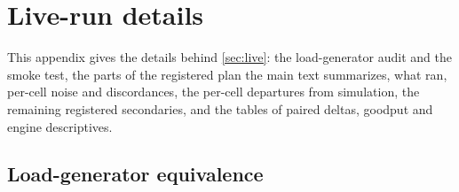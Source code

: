 %

\section{Live-run details}
\label{app:live}

This appendix gives the details behind \cref{sec:live}: the load-generator audit and the smoke test,
the parts of the registered plan the main text summarizes, what ran, per-cell noise and
discordances, the per-cell departures from simulation, the remaining registered secondaries, and
the tables of paired deltas, goodput and engine descriptives.

\subsection{Load-generator equivalence}

